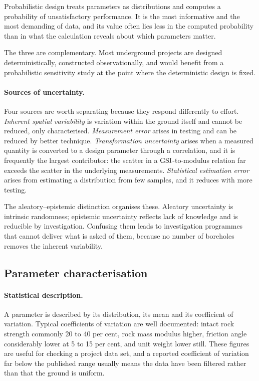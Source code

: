Probabilistic design treats parameters as distributions and computes a
probability of unsatisfactory performance. It is the most informative and the
most demanding of data, and its value often lies less in the computed
probability than in what the calculation reveals about which parameters
matter.

The three are complementary. Most underground projects
are designed deterministically, constructed observationally, and would benefit
from a probabilistic sensitivity study at the point where the deterministic
design is fixed.

\paragraph{Sources of uncertainty.}
Four sources are worth separating because they respond differently to effort.
\emph{Inherent spatial variability} is variation within the ground itself and
cannot be reduced, only characterised. \emph{Measurement error} arises in testing
and can be reduced by better technique. \emph{Transformation uncertainty}
arises when a measured quantity is converted to a design parameter through a
correlation, and it is frequently the largest contributor: the scatter in a
$\mathrm{GSI}$-to-modulus relation far exceeds the scatter in the underlying measurements.
\emph{Statistical estimation error} arises from estimating a distribution from
few samples, and it reduces with more testing.

The aleatory--epistemic distinction organises these. Aleatory uncertainty is
intrinsic randomness; epistemic uncertainty reflects lack of knowledge and is
reducible by investigation. Confusing them leads to investigation programmes
that cannot deliver what is asked of them, because no number of boreholes
removes the inherent variability.

\subsection{Parameter characterisation}
\label{sec:parameter-characterisation}

\paragraph{Statistical description.}
A parameter is described by its distribution, its mean and its coefficient of
variation. Typical coefficients of variation are well documented: intact rock
strength commonly 20 to 40 per cent, rock mass modulus higher, friction angle
considerably lower at 5 to 15 per cent, and unit weight lower still. These
figures are useful for checking a project data set, and a reported
coefficient of variation far below the published range usually means the data
have been filtered rather than that the ground is uniform.

